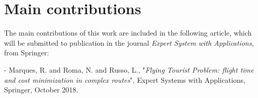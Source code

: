 \section{Main contributions}


The main contributions of this work are included in the following article, which will be submitted to publication in the journal \textit{Expert System with Applications}, from Springer:

- Marques, R. and Roma, N. and Russo, L., "\textit{Flying Tourist Problem: flight time and cost minimization in complex routes}", Expert Systems with Applications, Springer, October 2018.